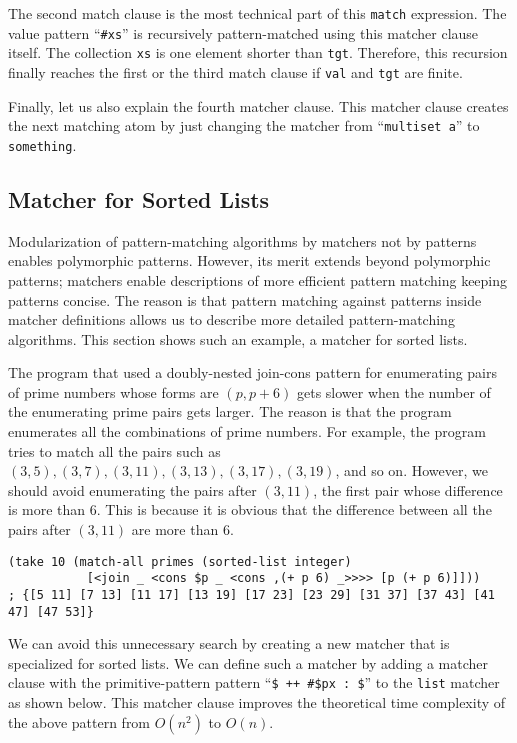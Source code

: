 \documentclass{article}
\begin{document}
The second match clause is the most technical part of this \texttt{match} expression.
The value pattern ``\verb|#xs|'' is recursively pattern-matched using this matcher clause itself.
The collection \texttt{xs} is one element shorter than \texttt{tgt}.
Therefore, this recursion finally reaches the first or the third match clause if \texttt{val} and \texttt{tgt} are finite.

\medskip

Finally, let us also explain the fourth matcher clause.
This matcher clause creates the next matching atom by just changing the matcher from ``\texttt{multiset a}'' to \texttt{something}.

\subsection{Matcher for Sorted Lists}\label{sorted-list}

Modularization of pattern-matching algorithms by matchers not by patterns enables polymorphic patterns.
However, its merit extends beyond polymorphic patterns; matchers enable descriptions of more efficient pattern matching keeping patterns concise.
The reason is that pattern matching against patterns inside matcher definitions allows us to describe more detailed pattern-matching algorithms.
This section shows such an example, a matcher for sorted lists.

The program that used a doubly-nested join-cons pattern for enumerating pairs of prime numbers whose forms are $(p,p+6)$ gets slower when the number of the enumerating prime pairs gets larger.
The reason is that the program enumerates all the combinations of prime numbers.
For example, the program tries to match all the pairs such as $(3,5), (3,7), (3,11), (3,13), (3, 17), (3,19)$, and so on.
However, we should avoid enumerating the pairs after $(3,11)$, the first pair whose difference is more than $6$.
This is because it is obvious that the difference between all the pairs after $(3,11)$ are more than $6$.

\begin{lstlisting}[language=egison]
(take 10 (match-all primes (sorted-list integer)
           [<join _ <cons $p _ <cons ,(+ p 6) _>>>> [p (+ p 6)]]))
; {[5 11] [7 13] [11 17] [13 19] [17 23] [23 29] [31 37] [37 43] [41 47] [47 53]}
\end{lstlisting}

We can avoid this unnecessary search by creating a new matcher that is specialized for sorted lists.
We can define such a matcher by adding a matcher clause with the primitive-pattern pattern ``\verb|$ ++ #$px : $|'' to the \texttt{list} matcher as shown below.
This matcher clause improves the theoretical time complexity of the above pattern from $O(n^2)$ to $O(n)$.
\end{document}
